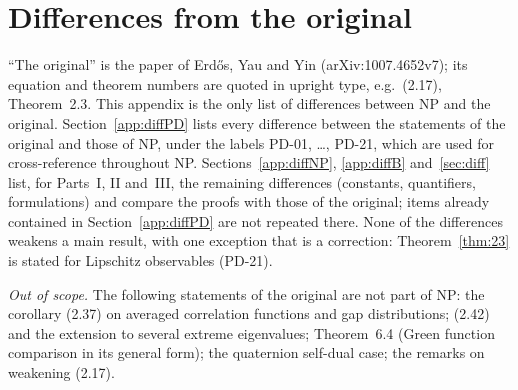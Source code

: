 \section{Differences from the original}\label{app:diff}
``The original'' is the paper of Erd\H{o}s, Yau and Yin (arXiv:1007.4652v7); its equation and theorem numbers are quoted in upright type, e.g.\ (2.17), Theorem~2.3.
This appendix is the only list of differences between NP and the original. Section~\ref{app:diffPD} lists every difference between the statements of the original and those of NP,
under the labels PD-01, \dots, PD-21, which are used for cross-reference throughout NP. Sections~\ref{app:diffNP}, \ref{app:diffB} and~\ref{sec:diff} list, for Parts~I, II and~III,
the remaining differences (constants, quantifiers, formulations) and compare the proofs with those of the original; items already contained in Section~\ref{app:diffPD} are not repeated there.
None of the differences weakens a main result, with one exception that is a correction: Theorem~\ref{thm:23} is stated for Lipschitz observables (PD-21).

\emph{Out of scope.} The following statements of the original are not part of NP: the corollary (2.37) on averaged correlation functions and gap distributions; (2.42) and the extension to several extreme eigenvalues;
Theorem~6.4 (Green function comparison in its general form); the quaternion self-dual case; the remarks on weakening (2.17).

